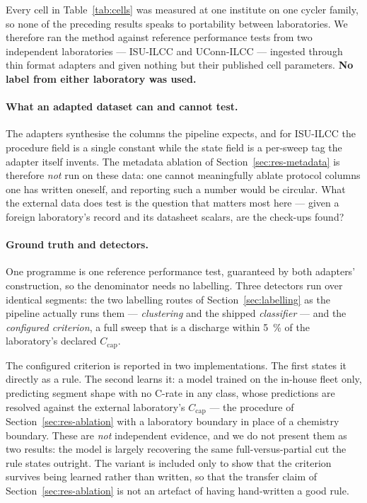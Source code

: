 \documentclass[preprint,3p,number]{elsarticle}
\begin{document}
Every cell in Table~\ref{tab:cells} was measured at one institute on one cycler
family, so none of the preceding results speaks to portability between
laboratories. We therefore ran the method against reference performance tests
from two independent laboratories --- ISU-ILCC and UConn-ILCC --- ingested
through thin format adapters and given nothing but their published cell
parameters. \textbf{No label from either laboratory was used.}

\paragraph{What an adapted dataset can and cannot test.} The adapters
synthesise the columns the pipeline expects, and for ISU-ILCC the procedure
field is a single constant while the state field is a per-sweep tag the adapter
itself invents. The metadata ablation of Section~\ref{sec:res-metadata} is
therefore \emph{not} run on these data: one cannot meaningfully ablate protocol
columns one has written oneself, and reporting such a number would be
circular. What the external data does test is the question that matters most
here --- given a foreign laboratory's record and its datasheet scalars, are the
check-ups found?

\paragraph{Ground truth and detectors.} One programme is one reference
performance test, guaranteed by both adapters' construction, so the denominator
needs no labelling. Three detectors run over identical segments: the two
labelling routes of Section~\ref{sec:labelling} as the pipeline actually runs
them --- \emph{clustering} and the shipped \emph{classifier} --- and the
\emph{configured criterion}, a full sweep that is a discharge within
\SI{5}{\percent} of the laboratory's declared $C_{\mathrm{cap}}$.

The configured criterion is reported in two implementations. The first states
it directly as a rule. The second learns it: a model trained on the in-house
fleet only, predicting segment shape with no C-rate in any class, whose
predictions are resolved against the external laboratory's $C_{\mathrm{cap}}$
--- the procedure of Section~\ref{sec:res-ablation} with a laboratory boundary
in place of a chemistry boundary. These are \emph{not} independent evidence, and
we do not present them as two results: the model is largely recovering the same
full-versus-partial cut the rule states outright. The variant is included only
to show that the criterion survives being learned rather than written, so that
the transfer claim of Section~\ref{sec:res-ablation} is not an artefact of
having hand-written a good rule.
\end{document}
